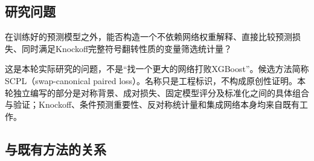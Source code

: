 \documentclass[UTF8,11pt,a4paper]{ctexart}
\begin{document}
\subsection{研究问题}\label{ux7814ux7a76ux95eeux9898}

在训练好的预测模型之外，能否构造一个不依赖网络权重解释、直接比较预测损失、同时满足Knockoff完整符号翻转性质的变量筛选统计量？

这是本轮实际研究的问题，不是``找一个更大的网络打败XGBoost''。候选方法简称SCPL（swap-canonical paired loss）。名称只是工程标识，不构成原创性证明。本轮独立编写的部分是对称背景、成对损失、固定模型评分及标准化之间的具体组合与验证；Knockoff、条件预测重要性、反对称统计量和集成网络本身均来自既有工作。

\subsection{与既有方法的关系}\label{ux4e0eux65e2ux6709ux65b9ux6cd5ux7684ux5173ux7cfb}
\end{document}
